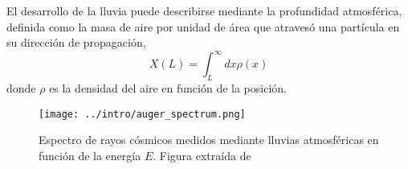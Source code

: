 El desarrollo de la lluvia puede describirse mediante la profundidad atmosférica, definida como la masa de aire por unidad de área que atravesó una partícula en su dirección de propagación, 
\begin{equation}
	X(L)= \int_L^\infty dx \rho(x)
\end{equation}
donde $\rho$ es la densidad del aire en función de la posición.

\begin{figure}[H]
	\centering
	\texttt{[image: ../intro/auger\_spectrum.png]}
	\caption{Espectro de rayos cósmicos medidos mediante lluvias atmosféricas en función de la energía $E$. Figura extraída de \cite{PGD}}
	\label{fig:spectra}
\end{figure}